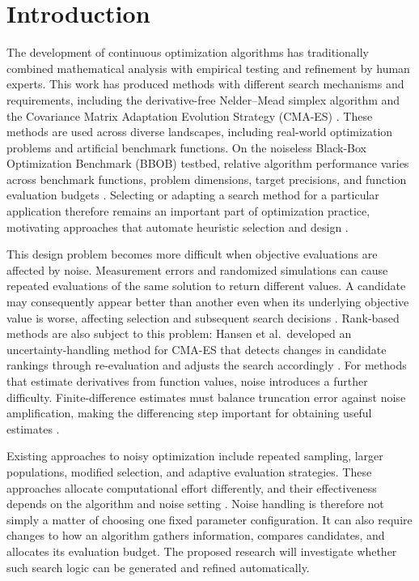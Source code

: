 \chapter{Introduction}
\label{chap:intro}

The development of continuous optimization algorithms has traditionally
combined mathematical analysis with empirical testing and refinement by
human experts. This work has produced methods with different search
mechanisms and requirements, including the derivative-free Nelder--Mead
simplex algorithm \cite{Nelder1965} and the Covariance Matrix Adaptation
Evolution Strategy (CMA-ES) \cite{Hansen2001}. These methods are used
across diverse landscapes, including real-world optimization problems
and artificial benchmark functions. On the noiseless Black-Box
Optimization Benchmark (BBOB) testbed, relative algorithm performance
varies across benchmark functions, problem dimensions, target precisions,
and function evaluation budgets \cite{Hansen2010}. Selecting or adapting
a search method for a particular application therefore remains an
important part of optimization practice, motivating approaches that
automate heuristic selection and design \cite{Burke2013}.

This design problem becomes more difficult when objective evaluations
are affected by noise. Measurement errors and randomized simulations
can cause repeated evaluations of the same solution to return different
values. A candidate may consequently appear better than another even
when its underlying objective value is worse, affecting selection and
subsequent search decisions \cite{Jin2005}. Rank-based methods are also
subject to this problem: Hansen et al.\ developed an uncertainty-handling
method for CMA-ES that detects changes in candidate rankings through
re-evaluation and adjusts the search accordingly \cite{Hansen2009}.
For methods that estimate derivatives from function values, noise
introduces a further difficulty. Finite-difference estimates must balance
truncation error against noise amplification, making the differencing
step important for obtaining useful estimates \cite{MoreWild2012}.

Existing approaches to noisy optimization include repeated sampling,
larger populations, modified selection, and adaptive evaluation
strategies. These approaches allocate computational effort differently,
and their effectiveness depends on the algorithm and noise setting
\cite{Jin2005}. Noise handling is therefore not simply a matter of
choosing one fixed parameter configuration. It can also require changes
to how an algorithm gathers information, compares candidates, and
allocates its evaluation budget. The proposed research will investigate
whether such search logic can be generated and refined automatically.

